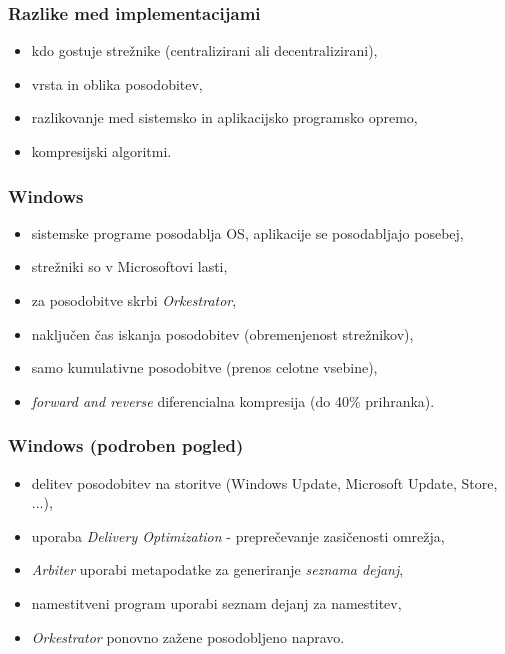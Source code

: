 \documentclass[aspectratio=169]{beamer}
\begin{document}
    \begin{frame}
        \frametitle{Razlike med implementacijami}
        \begin{itemize}
            \item kdo gostuje strežnike (centralizirani ali decentralizirani),
            \item vrsta in oblika posodobitev,
            \item razlikovanje med sistemsko in aplikacijsko programsko opremo,
            \item kompresijski algoritmi.
        \end{itemize}
    \end{frame}

    \begin{frame}
        \frametitle{Windows}
        \begin{itemize}
            \item sistemske programe posodablja OS, aplikacije se posodabljajo posebej,
            \item strežniki so v Microsoftovi lasti,
            \item za posodobitve skrbi \emph{Orkestrator},
            \item naključen čas iskanja posodobitev (obremenjenost strežnikov),
            \item samo kumulativne posodobitve (prenos celotne vsebine),
            \item \emph{forward and reverse} diferencialna kompresija (do 40\% prihranka).
        \end{itemize}
    \end{frame}

    \begin{frame}
        \frametitle{Windows (podroben pogled)}
        \begin{itemize}
            \item delitev posodobitev na storitve (Windows Update, Microsoft Update, Store, ...),
            \item uporaba \emph{Delivery Optimization} - preprečevanje zasičenosti omrežja,
            \item \emph{Arbiter} uporabi metapodatke za generiranje \emph{seznama dejanj},
            \item namestitveni program uporabi seznam dejanj za namestitev,
            \item \emph{Orkestrator} ponovno zažene posodobljeno napravo.
        \end{itemize}
    \end{frame}
\end{document}
